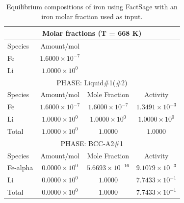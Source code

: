 \begin{table}[ht]
	\centering
	\label{tab:updated_stream_phases}
	\begin{tabular}{lccc}
	\hline
	\multicolumn{4}{c}{Molar fractions (T = 668 K)} \\
	\hline
	Species & Amount/mol & & \\
	\hline
	Fe & $1.6000 \times 10^{-7}$ & & \\
	Li & $1.0000 \times 10^{0}$ & & \\
	\hline
	\multicolumn{4}{c}{PHASE: Liquid\#1(\#2)} \\
	\hline
	Species & Amount/mol & Mole Fraction & Activity \\
	\hline
	Fe & $1.6000 \times 10^{-7}$ & $1.6000 \times 10^{-7}$ & $1.3491 \times 10^{-3}$ \\
	Li & $1.0000 \times 10^{0}$ & $1.0000 \times 10^{0}$ & $1.0000 \times 10^{0}$ \\
	Total & $1.0000 \times 10^{0}$ & $1.0000$ & $1.0000$ \\
	\hline
	\multicolumn{4}{c}{PHASE: BCC-A2\#1} \\
	\hline
	Species & Amount/mol & Mole Fraction & Activity \\
	\hline
	Fe-alpha & $0.0000 \times 10^{0}$ & $5.6693 \times 10^{-16}$ & $9.1079 \times 10^{-3}$ \\
	Li & $0.0000 \times 10^{0}$ & $1.0000$ & $7.7433 \times 10^{-1}$ \\
	Total & $0.0000 \times 10^{0}$ & $1.0000$ & $7.7433 \times 10^{-1}$ \\
	\hline
	\end{tabular}
	\caption{Equilibrium compositions of iron using FactSage with an iron molar fraction used as input.}

\end{table}
	
